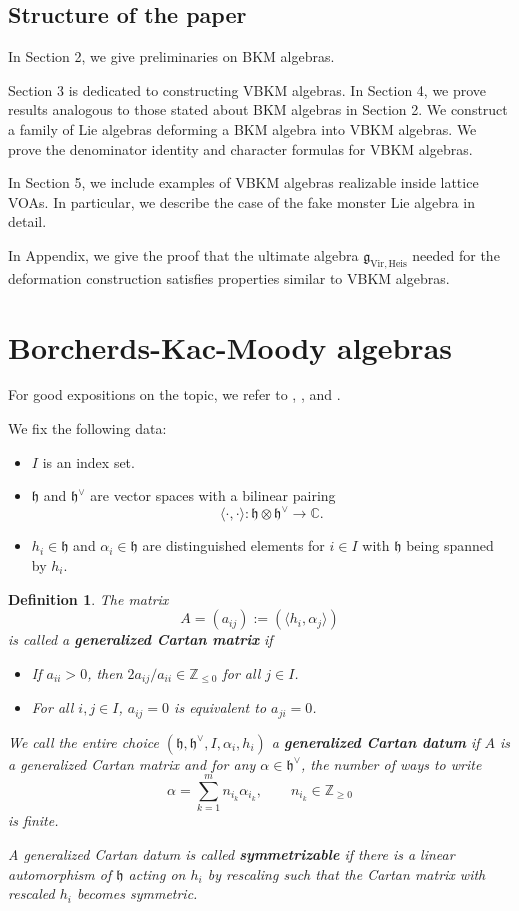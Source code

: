 \documentclass[11pt]{amsart}
\newcommand{\rge}{\rangle}
\newcommand{\lge}{\langle}
\renewcommand{\le}{\leqslant}
\renewcommand{\ge}{\geqslant}
\newcommand{\C}{\mathbb{C}}
\newcommand{\Z}{\mathbb{Z}}
\newcommand{\g}{\mathfrak{g}}
\newcommand{\h}{\mathfrak{h}}
\newcommand{\Vir}{\mathrm{Vir}}
\newcommand{\Heis}{\mathrm{Heis}}
\numberwithin{equation}{section}
\theoremstyle{plain}
\newtheorem{definition}[theorem]{Definition}
\theoremstyle{definition}
\begin{document}
\subsection{Structure of the paper}
In Section 2, we give preliminaries on BKM algebras.

Section 3 is dedicated to constructing VBKM algebras. In Section 4, we prove results analogous to those stated about BKM algebras in Section 2. We construct a family of Lie algebras deforming a BKM algebra into VBKM algebras. We prove the denominator identity and character formulas for VBKM algebras.

In Section 5, we include examples of VBKM algebras realizable inside lattice VOAs. In particular, we describe the case of the fake monster Lie algebra in detail.

In Appendix, we give the proof that the ultimate algebra $\g_{\Vir,\Heis}$ needed for the deformation construction satisfies properties similar to VBKM algebras.

\section{Borcherds-Kac-Moody algebras}\label{s:BKM_algebras}
 For good expositions on the topic, we refer to \cite{Jur96}, \cite{Ray06}, and \cite{Nie02}.

We fix the following data:
\begin{itemize}
    \item $I$ is an index set.
    \item $\h$ and $\h^\vee$ are vector spaces with a bilinear pairing 
    $$
    \lge\cdot,\cdot\rge:\h\otimes\h^\vee\to \C.
    $$
    \item $h_i\in\h$ and $\alpha_i\in\h$ are distinguished elements for $i\in I$ with $\h$ being spanned by $h_i$.
\end{itemize}

\begin{definition}
    The matrix 
$$
A=(a_{ij}):=(\lge h_i,\alpha_j\rge)
$$
is called a {\bfseries generalized Cartan matrix} if
\begin{itemize}
    \item If $a_{ii}>0$, then $2a_{ij}/a_{ii}\in \Z_{\le 0}$ for all $j\in I$. 
    \item For all $i,j\in I$, $a_{ij}=0$ is equivalent to $a_{ji}=0$.
\end{itemize}

We call the entire choice $(\h,\h^\vee,I,\alpha_i,h_i)$ a {\bfseries generalized Cartan datum} if $A$ is a generalized Cartan matrix and for any $\alpha\in\h^\vee$, the number of ways to write
\begin{equation}\label{eq:finiteness_condition}
   \alpha=\sum_{k=1}^mn_{i_k}\alpha_{i_k},\qquad n_{i_k}\in\Z_{\ge 0}
\end{equation}
is finite.

A generalized Cartan datum is called {\bfseries symmetrizable} if there is a linear automorphism of $\h$ acting on $h_i$ by rescaling such that the Cartan matrix with rescaled $h_i$ becomes symmetric.
\end{definition}
\end{document}
